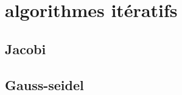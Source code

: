 \documentclass[a4paper]{article}
\begin{document}
\section*{algorithmes itératifs}

\subsection*{Jacobi}

\subsection*{Gauss-seidel}
\end{document}
